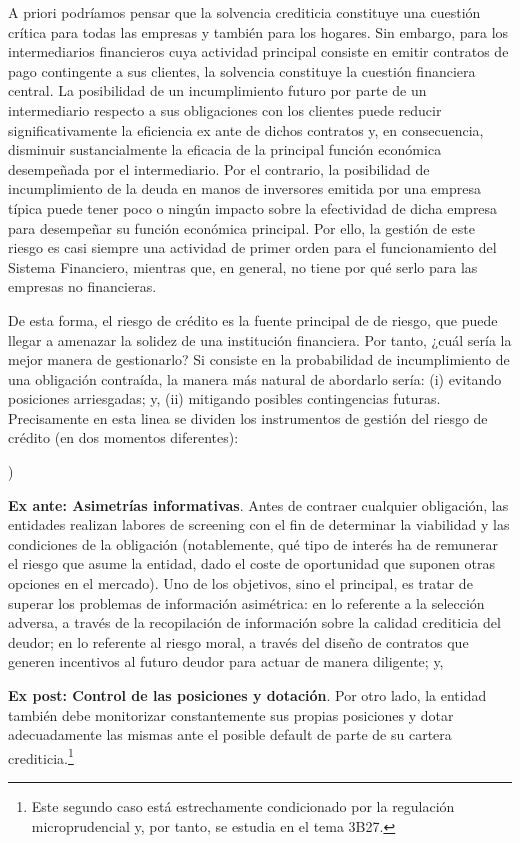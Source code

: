 \documentclass[10pt,a4paper]{article}
\newcounter{alphaitem}
\newenvironment{la}
      {\begin{list}{\alph{alphaitem})}{%
          \usecounter{alphaitem}%
          \setlength{\leftmargin}{1cm}%
          \setlength{\parskip}{3pt}%
          \setlength{\itemsep}{0pt}%
          \setlength{\parsep}{0pt}%
      }}
      {\end{list}}
\begin{document}
A priori podríamos pensar que la solvencia crediticia constituye una cuestión crítica para todas las empresas y también para los hogares. Sin embargo, para los intermediarios financieros cuya actividad principal consiste en emitir contratos de pago contingente a sus clientes, la solvencia constituye la cuestión financiera central. La posibilidad de un incumplimiento futuro por parte de un intermediario respecto a sus obligaciones con los clientes puede reducir significativamente la eficiencia ex ante de dichos contratos y, en consecuencia, disminuir sustancialmente la eficacia de la principal función económica desempeñada por el intermediario. Por el contrario, la posibilidad de incumplimiento de la deuda en manos de inversores emitida por una empresa típica puede tener poco o ningún impacto sobre la efectividad de dicha empresa para desempeñar su función económica principal. Por ello, la gestión de este riesgo es casi siempre una actividad de primer orden para el funcionamiento del Sistema Financiero, mientras que, en general, no tiene por qué serlo para las empresas no financieras. 

De esta forma, el riesgo de crédito es la fuente principal de de riesgo, que puede llegar a amenazar la solidez de una institución financiera. Por tanto, ¿cuál sería la mejor manera de gestionarlo? Si consiste en la probabilidad de incumplimiento de una obligación contraída, la manera más natural de abordarlo sería: (i) evitando posiciones arriesgadas; y, (ii) mitigando posibles contingencias futuras. Precisamente en esta linea se dividen los instrumentos de gestión del riesgo de crédito (en dos momentos diferentes):
\begin{la}
    \item \textbf{Ex ante: Asimetrías informativas}. Antes de contraer cualquier obligación, las entidades realizan labores de screening con el fin de determinar la viabilidad y las condiciones de la obligación (notablemente, qué tipo de interés ha de remunerar el riesgo que asume la entidad, dado el coste de oportunidad que suponen otras opciones en el mercado). Uno de los objetivos, sino el principal, es tratar de superar los problemas de información asimétrica: en lo referente a la selección adversa, a través de la recopilación de información sobre la calidad crediticia del deudor; en lo referente al riesgo moral, a través del diseño de contratos que generen incentivos al futuro deudor para actuar de manera diligente; y,
    \item \textbf{Ex post: Control de las posiciones y dotación}. Por otro lado, la entidad también debe monitorizar constantemente sus propias posiciones y dotar adecuadamente las mismas ante el posible default de parte de su cartera crediticia.\footnote{%
        Este segundo caso está estrechamente condicionado por la regulación microprudencial y, por tanto, se estudia en el tema 3B27.
    }
\end{la}
\end{document}
